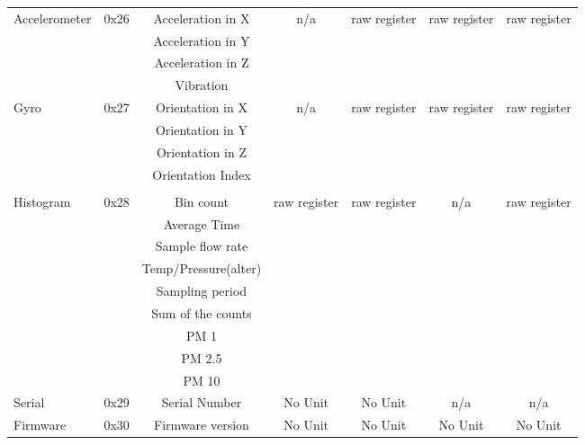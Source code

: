 \begin{landscape}
\begin{longtable}{l|c|c|c|c|c|c}
    \multirow{4}{*}{Accelerometer} & \multirow{4}{*}{0x26} & Acceleration in X & \multirow{4}{*}{n/a} & \multirow{4}{*}{raw register} & \multirow{4}{*}{raw register} & \multirow{4}{*}{raw register} \\ \cline{3-3}
    & & Acceleration in Y & & & & \\ \cline{3-3}
    & & Acceleration in Z & & & & \\ \cline{3-3}
    & & Vibration & & & & \\ \hline
    \multirow{4}{*}{Gyro} & \multirow{4}{*}{0x27} & Orientation in X & \multirow{4}{*}{n/a} & \multirow{4}{*}{raw register} & \multirow{4}{*}{raw register} & \multirow{4}{*}{raw register} \\ \cline{3-3}
    & & Orientation in Y & & & & \\ \cline{3-3}
    & & Orientation in Z & & & & \\ \cline {3-3}
    & & Orientation Index & & & & \\ \hline

\rowcolor{black!8} \multicolumn{7}{c}{{Alpha sensor}} \\ \hline
    \multirow{9}{*}{Histogram} & \multirow{9}{*}{0x28} & Bin count & \multirow{9}{*}{raw register} & \multirow{9}{*}{raw register} & \multirow{9}{*}{n/a} & \multirow{9}{*}{raw register} \\ \cline{3-3}
    & & Average Time & & & & \\ \cline{3-3}
    & & Sample flow rate & & & & \\ \cline{3-3}
    & & Temp/Pressure(alter) & & & & \\ \cline{3-3}
    & & Sampling period & & & &\\ \cline{3-3}
    & & Sum of the counts & & & &\\ \cline{3-3}
    & & PM 1 & & & & \\ \cline{3-3}
    & & PM 2.5 & & & & \\ \cline{3-3}
    & & PM 10 & & & & \\ \hline

    Serial & 0x29 & Serial Number & No Unit & No Unit & n/a & n/a \\ \hline
    Firmware & 0x30 & Firmware version & No Unit & No Unit & No Unit & No Unit \\ \hline


\end{longtable}
\end{landscape}
